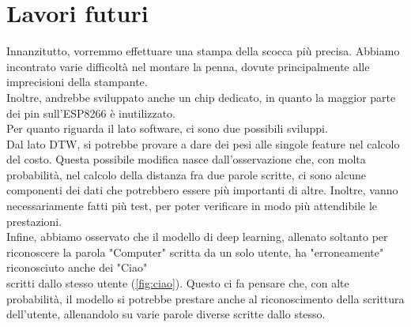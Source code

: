 \documentclass[8pt,notitlepage]{report}
\begin{document}
\chapter{Lavori futuri}

	Innanzitutto, vorremmo effettuare una stampa della scocca più precisa. Abbiamo incontrato varie difficoltà nel montare la penna, dovute principalmente alle imprecisioni della stampante. \\
	Inoltre, andrebbe sviluppato anche un chip dedicato, in quanto la maggior parte dei pin sull'ESP8266 è inutilizzato. \\
	Per quanto riguarda il lato software, ci sono due possibili sviluppi. 
	\\ Dal lato DTW, si potrebbe provare a dare dei pesi alle singole feature nel calcolo del costo. Questa possibile modifica nasce dall'osservazione che, con molta probabilità, nel calcolo della distanza fra due parole scritte, ci sono alcune componenti dei dati che potrebbero essere più importanti di altre. Inoltre, vanno necessariamente fatti più test, per poter verificare in modo più attendibile le prestazioni.
	\\ Infine, abbiamo osservato che il modello di deep learning, allenato soltanto per riconoscere la parola "Computer" scritta da un solo utente, ha "erroneamente" riconosciuto anche dei "Ciao" \\ scritti dallo stesso utente (\cref{fig:ciao}). Questo ci fa pensare che, con alte probabilità, il modello si potrebbe prestare anche al riconoscimento della scrittura dell'utente, allenandolo su varie parole diverse scritte dallo stesso.
	
\end{document}
